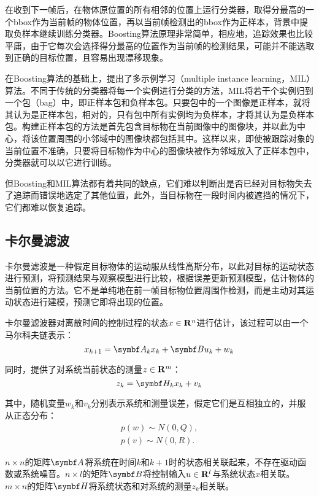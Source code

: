   在收到下一帧后，在物体原位置的所有相邻的位置上运行分类器，取得分最高的一个bbox作为当前帧的物体位置，再以当前帧检测出的bbox作为正样本，背景中提取负样本继续训练分类器。Boosting算法原理非常简单，相应地，追踪效果也比较平庸，由于它每次会选择得分最高的位置作为当前帧的检测结果，可能并不能选取到正确的目标位置，且容易出现漂移现象。

  在Boosting算法的基础上，\citet{babenko2009visual}提出了多示例学习（multiple instance learning，MIL）算法。不同于传统的分类器将每一个实例进行分类的方法，MIL将若干个实例归到一个包（bag）中，即正样本包和负样本包。只要包中的一个图像是正样本，就将其认为是正样本包，相对的，只有包中所有实例均为负样本，才将其认为是负样本包。构建正样本包的方法是首先包含目标物在当前图像中的图像块，并以此为中心，将该位置周围的小邻域中的图像块都包括其中。这样以来，即使被跟踪对象的当前位置不准确，只要将目标物作为中心的图像块被作为邻域放入了正样本包中，分类器就可以以它进行训练。

  但Boosting和MIL算法都有着共同的缺点，它们难以判断出是否已经对目标物失去了追踪而错误地选定了其他位置，此外，当目标物在一段时间内被遮挡的情况下，它们都难以恢复追踪。

\subsection{卡尔曼滤波}

  卡尔曼滤波是一种假定目标物体的运动服从线性高斯分布，以此对目标的运动状态进行预测，将预测结果与观察模型进行比较，根据误差更新预测模型，估计物体的当前位置的方法。它不是单纯地在前一帧目标物位置周围作检测，而是主动对其运动状态进行建模，预测它即将出现的位置\cite{welch1995introduction}。
  
  卡尔曼滤波器对离散时间的控制过程的状态$x\in \mathbf{R}^n$进行估计，该过程可以由一个马尔科夫链表示：
$$x_{k+1}=\mat{A}_k x_k + \mat{B} u_k + w_k$$

  同时，提供了对系统当前状态的测量$z\in \mathbf{R}^m$：
$$z_k=\mat{H}_k x_k + v_k$$

  其中，随机变量$w_k$和$v_k$分别表示系统和测量误差，假定它们是互相独立的，并服从正态分布：
\begin{gather*}
p(w)\sim N(0,Q),\\
p(v)\sim N(0,R).
\end{gather*}
  
  $n\times n$的矩阵$\mat{A}$将系统在时间$k$和$k+1$时的状态相关联起来，不存在驱动函数或系统噪音。$n\times l$的矩阵$\mat{B}$将控制输入$u\in \mathbf{R}^l$与系统状态$x$相关联。$m\times n$的矩阵$\mat{H}$将系统状态和对系统的测量$z_k$相关联。

